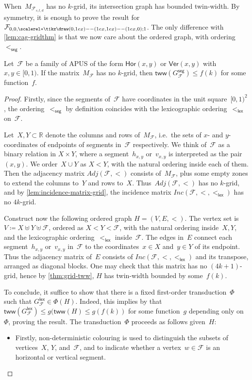 \documentclass[a4paper,UKenglish,cleveref,thm-restate]{lipics-v2021}
\theoremstyle{remark}
\newcommand{\eqdef}{\coloneqq}
\newcommand{\Fc}{\mathcal{F}}
\newcommand{\tww}{\mathsf{tww}}
\newcommand{\R}{\mathbb{R}}
\newcommand{\lex}{\mathsf{lex}}
\newcommand{\urc}{{\scalerel*{\tikz \draw (0,1ex) -- (1ex,1ex) -- (1ex,0);}{1}}}
\newcommand{\seg}{\mathsf{seg}}
\newcommand{\Vseg}{\mathsf{Ver}}
\newcommand{\Hseg}{\mathsf{Hor}}
\newcommand{\adj}{Adj}
\newcommand{\inc}{Inc}
\begin{document}
When~$M_{\Fc_{s,t,d}}$ has no $k$-grid, its intersection graph has bounded twin-width.
By symmetry, it is enough to prove the result for~$\Fc_{0,0,\urc}$.
The only difference with \cref{lem:cag-gridthm} is that we now care about the ordered graph, with ordering~$<_\seg$.
\begin{lemma}\label{lem:gridthm-apus}
    Let~$\Fc$ be a family of APUS of the form $\Hseg(x,y)$ or $\Vseg(x,y)$ with $x,y \in [0,1)$.
    If the matrix~$M_\Fc$ has no $k$-grid, then $\tww(G_\Fc^\seg) \le f(k)$ for some function~$f$.
\end{lemma}
\begin{proof}
    Firstly, since the segments of~$\Fc$ have coordinates in the unit square~$[0,1)^2$,
    the ordering~$<_\seg$ by definition coincides with the lexicographic ordering~$<_\lex$ on~$\Fc$.

    Let~$X,Y \subset \R$ denote the columns and rows of~$M_\Fc$, i.e.\ the sets of $x$- and $y$-coordinates of endpoints of segments in~$\Fc$ respectively.
    We think of~$\Fc$ as a binary relation in $X \times Y$, where a segment~$h_{x,y}$ or~$v_{x,y}$ is interpreted as the pair~$(x,y)$.
    We order~$X \cup Y$ as $X < Y$, with the natural ordering inside each of them.
    Then the adjacency matrix $\adj(\Fc,<)$ consists of~$M_\Fc$, plus some empty zones to extend the columns to~$Y$ and rows to~$X$.
    Thus~$\adj(\Fc,<)$ has no $k$-grid, and by \cref{lem:incidence-matrix-grid}, the incidence matrix $\inc(\Fc,<,<_\lex)$ has no $4k$-grid.

    Construct now the following ordered graph $H = (V,E,<)$.
    The vertex set is $V \eqdef X \uplus Y \uplus \Fc$, ordered as $X < Y < \Fc$, with the natural ordering inside~$X,Y$, and the lexicographic ordering~$<_\lex$ inside~$\Fc$.
    The edges in~$E$ connect each segment~$h_{x,y}$ or~$v_{x,y}$ in~$\Fc$ to the coordinates~$x \in X$ and~$y \in Y$ of its endpoint.
    Thus the adjacency matrix of~$E$ consists of $\inc(\Fc,<,<_\lex)$ and its transpose, arranged as diagonal blocks.
    One may check that this matrix has no $(4k+1)$-grid,
    hence by \cref{thm:grid-tww}, $H$ has twin-width bounded by some~$f(k)$.

    To conclude, it suffice to show that there is a fixed first-order transduction~$\Phi$ such that $G_\Fc^\lex \in \Phi(H)$.
    Indeed, this implies by \cite[Theorem~8.1]{Bonnet2022twinwidth1} that $\tww(G_\Fc^\lex) \le g(\tww(H) \le g(f(k))$ for some function~$g$ depending only on~$\Phi$, proving the result.
    The transduction~$\Phi$ proceeds as follows given~$H$:
    \begin{itemize}
        \item Firstly, non-deterministic colouring is used to distinguish the subsets of vertices~$X$, $Y$, and~$\Fc$,
        and to indicate whether a vertex~$w \in \Fc$ is an horizontal or vertical segment.
        

\end{itemize}
\end{proof}
\end{document}
